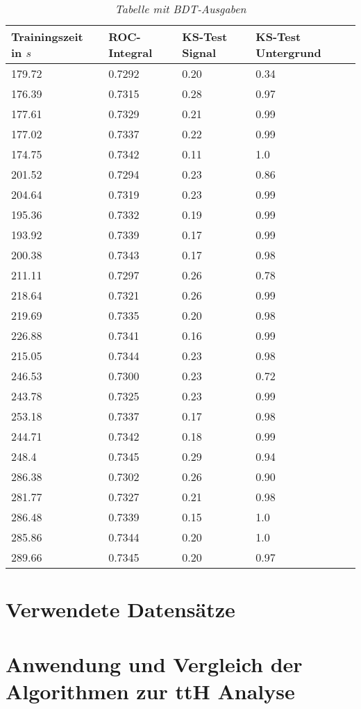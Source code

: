 \begin{table}[hhh]\parbox{12cm}{
  \caption[TMVA 6j4t Ergebnisse]{\it Tabelle mit BDT-Ausgaben}%
  }\label{tab:tmva}
  \begin{center}
  \begin{tabular}{llll}
  \hline
  Trainingszeit in $s$ & ROC-Integral & KS-Test Signal & KS-Test Untergrund\\
  \hline
179.72 & 0.7292 & 0.20 & 0.34\\ 
176.39 & 0.7315 & 0.28 & 0.97\\ 
177.61 & 0.7329 & 0.21 & 0.99\\ 
177.02 & 0.7337 & 0.22 & 0.99\\ 
174.75 & 0.7342 & 0.11 & 1.0\\ 
201.52 & 0.7294 & 0.23 & 0.86\\ 
204.64 & 0.7319 & 0.23 & 0.99\\ 
195.36 & 0.7332 & 0.19 & 0.99\\ 
193.92 & 0.7339 & 0.17 & 0.99\\ 
200.38 & 0.7343 & 0.17 & 0.98\\ 
211.11 & 0.7297 & 0.26 & 0.78\\ 
218.64 & 0.7321 & 0.26 & 0.99\\ 
219.69 & 0.7335 & 0.20 & 0.98\\ 
226.88 & 0.7341 & 0.16 & 0.99\\ 
215.05 & 0.7344 & 0.23 & 0.98\\ 
246.53 & 0.7300 & 0.23 & 0.72\\ 
243.78 & 0.7325 & 0.23 & 0.99\\
253.18 & 0.7337 & 0.17 & 0.98\\ 
244.71 & 0.7342 & 0.18 & 0.99\\ 
248.4  & 0.7345 & 0.29 & 0.94\\ 
286.38 & 0.7302 & 0.26 & 0.90\\ 
281.77 & 0.7327 & 0.21 & 0.98\\ 
286.48 & 0.7339 & 0.15 & 1.0\\ 
285.86 & 0.7344 & 0.20 & 1.0\\ 
289.66 & 0.7345 & 0.20 & 0.97\\ 
  \hline
  \end{tabular}
  \end{center}
\end{table}

\section{Verwendete Datens\"atze}
\label{ch:Vergleich:sec:Daten}

\section{Anwendung und Vergleich der Algorithmen zur ttH Analyse}
\label{ch:Vergleich:sec:ttH}
